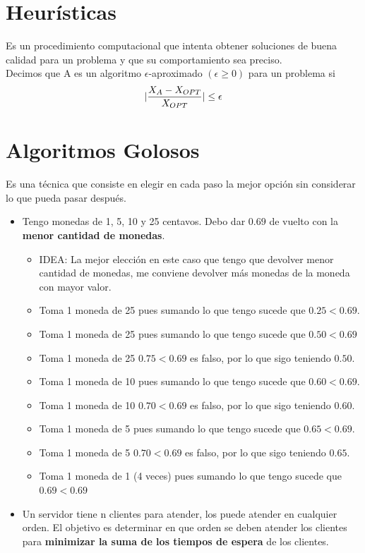 \documentclass[10pt,a4paper]{article}
\begin{document}
\section*{Heurísticas}
Es un procedimiento computacional que intenta obtener soluciones de buena calidad para un problema y que su comportamiento sea preciso. \\
Decimos que A es un algoritmo $\epsilon$-aproximado $(\epsilon \ge 0)$ para un problema si \[|\frac{X_{A} - X_{OPT}}{X_{OPT}}| \le \epsilon\]
\section*{Algoritmos Golosos}
Es una técnica que consiste en elegir en cada paso la mejor opción sin considerar lo que pueda pasar después.
\begin{itemize}
    \item Tengo monedas de 1, 5, 10 y 25 centavos. Debo dar $0.69$ de vuelto con la \textbf{menor cantidad de monedas}. 
    \begin{itemize}
        \item IDEA: La mejor elección en este caso que tengo que devolver menor cantidad de monedas, me conviene devolver más monedas de la moneda con mayor valor. 
        \item Toma 1 moneda de 25 pues sumando lo que tengo sucede que $0.25<0.69$.
        \item Toma 1 moneda de 25 pues sumando lo que tengo sucede que $0.50<0.69$
        \item Toma 1 moneda de 25 $0.75<0.69$ es falso, por lo que sigo teniendo $0.50$.
        \item Toma 1 moneda de 10 pues sumando lo que tengo sucede que $0.60<0.69$.
        \item Toma 1 moneda de 10 $0.70<0.69$ es falso, por lo que sigo teniendo $0.60$.
        \item Toma 1 moneda de 5 pues sumando lo que tengo sucede que $0.65<0.69$.
        \item Toma 1 moneda de 5 $0.70<0.69$ es falso, por lo que sigo teniendo $0.65$.
        \item Toma 1 moneda de 1 (4 veces) pues sumando lo que tengo sucede que $0.69<0.69$
    \end{itemize}
    \item Un servidor tiene n clientes para atender, los puede atender en cualquier orden. El objetivo es determinar en que orden se deben atender los clientes para \textbf{minimizar la suma de los tiempos de espera} de los clientes. 

\end{itemize}
\end{document}
